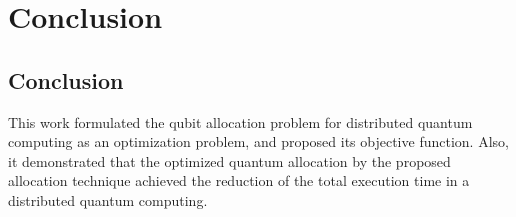 \chapter{Conclusion}
\label{conclusion}
\section{Conclusion}
This work formulated the qubit allocation problem for distributed quantum computing as an optimization problem, and proposed its objective function.  Also, it demonstrated that the optimized quantum allocation by the proposed allocation technique achieved the reduction of the total execution time in a distributed quantum computing.


